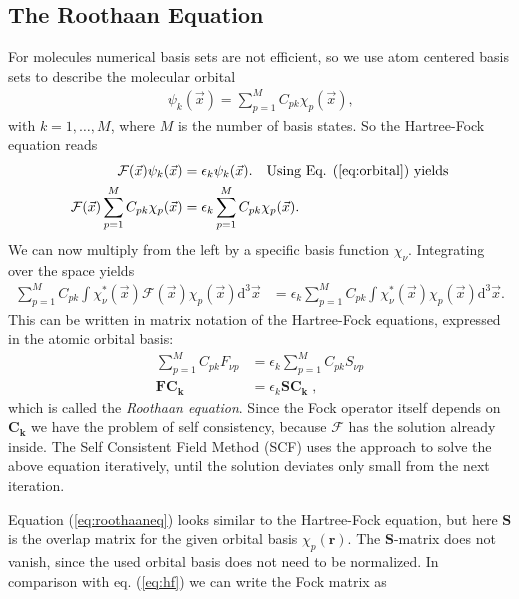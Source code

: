 \documentclass[twoside,        %
			   11pt,			%
               BCOR10mm,       %
               ngerman,english  %
               ]{scrartcl}
\begin{document}
\subsection{The Roothaan Equation}\label{subseq:roothaan}
For molecules numerical basis sets are not efficient, so we use atom centered basis sets to describe the molecular orbital
\begin{align}\label{eq:orbital}
    \psi_k(\vec{x}) = \sum_{p=1}^M C_{pk} \chi_p (\vec{x})\text{,}
\end{align}
with $k = 1,\dots, M$, where $M$ is the number of basis states.
So the Hartree-Fock equation reads
\begin{align*}
    \mathcal{F} (\vec{x})   \psi_k(\vec{x}) &= \epsilon_k    \psi_k(\vec{x})\text{.} \quad \text{Using Eq. (\ref{eq:orbital}) yields}\\
    \mathcal{F} (\vec{x})  \sum_{p=1}^M C_{pk} \chi_p (\vec{x}) &= \epsilon_k \sum_{p=1}^M C_{pk} \chi_p (\vec{x})\text{.}\\
\end{align*}
We can now multiply from the left by a specific basis function $\chi_\nu$. Integrating over the space yields
\begin{align*}
     \sum_{p=1}^M C_{pk} \int \chi_\nu^*(\vec{x})  \mathcal{F} (\vec{x}) \chi_p(\vec{x})\text{d}^3 \vec{x} & =  \epsilon_k  \sum_{p=1}^M C_{pk} \int \chi_\nu^*(\vec{x}) \chi_p(\vec{x})\text{d}^3 \vec{x}   \text{.}
\end{align*}
This can be written in matrix notation of the Hartree-Fock equations, expressed in the atomic orbital basis:
\begin{align}\label{eq:roothaaneq}
    \sum_{p=1}^M C_{pk} F_{\nu p}  &= \epsilon_k \sum_{p=1}^M C_{pk} S_{\nu p}\nonumber\\
    \mathbf{F} \mathbf{C_k} &= \epsilon_k \mathbf{S} \mathbf{C_k} \; \text{,}
\end{align} which is called the \textit{Roothaan equation}.
Since the Fock operator itself depends on $\mathbf{C_k}$ we have the problem of self consistency, because $\mathcal{F}$ has the solution already inside. The Self Consistent Field Method (SCF) uses the approach to solve the above equation iteratively, until the solution deviates only small from the next iteration.
\par Equation (\ref{eq:roothaaneq}) looks similar to the Hartree-Fock equation, but here $\mathbf{S}$ is the overlap matrix for the given orbital basis $\chi_p (\mathbf{r})$. The $\mathbf{S}$-matrix does not vanish, since the used orbital basis does not need to be normalized. In comparison with eq. (\ref{eq:hf}) we can write the Fock matrix as \cite{Thijssen2007}
\end{document}
